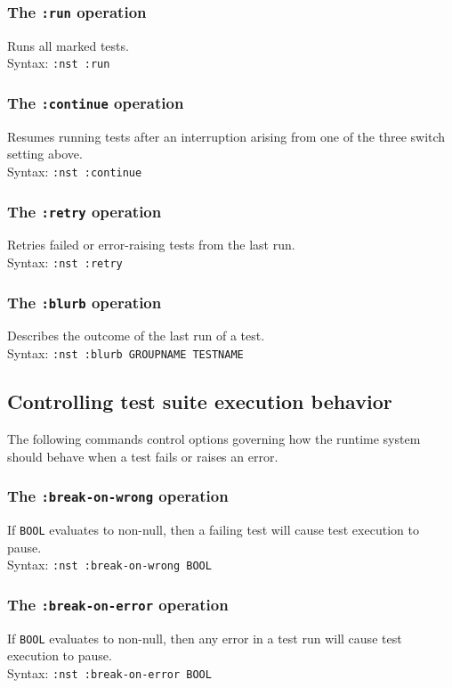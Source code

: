 \subsubsection{The \texttt{:run} operation}
%
Runs all marked tests.
\\ Syntax: \texttt{:nst :run}

\subsubsection{The \texttt{:continue} operation}
%
Resumes running tests after an interruption arising from one of the
three switch setting above.
\\ Syntax: \texttt{:nst :continue}

\subsubsection{The \texttt{:retry} operation}
%
Retries failed or error-raising tests from the last run.
\\ Syntax: \texttt{:nst :retry}

\subsubsection{The \texttt{:blurb} operation}
%
Describes the outcome of the last run of a test.
\\ Syntax: \texttt{:nst :blurb GROUPNAME TESTNAME}

\subsection{Controlling test suite execution behavior}
The following commands control options governing how the runtime
system should behave when a test fails or raises an error.

\subsubsection{The \texttt{:break-on-wrong} operation}
%
If \texttt{BOOL} evaluates to non-null, then a failing test will cause
test execution to pause.
\\ Syntax: \texttt{:nst :break-on-wrong BOOL}

\subsubsection{The \texttt{:break-on-error} operation}
%
If \texttt{BOOL} evaluates to non-null, then any error in a test run
will cause test execution to pause.
\\ Syntax: \texttt{:nst :break-on-error BOOL}

